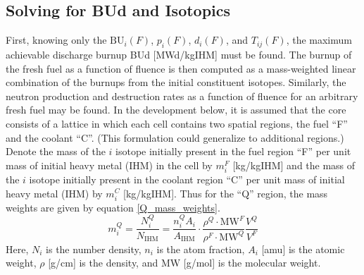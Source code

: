 \subsection{Solving for BUd and Isotopics}
\label{1g_sec:solve_BUd_iso}
First, knowing only the $\mbox{BU}_i(F)$, $p_i(F)$, $d_i(F)$, and $T_{ij}(F)$,
the maximum achievable discharge burnup BUd [MWd/kgIHM] must be found.  The burnup of the fresh 
fuel as a function of fluence is then computed as a mass-weighted linear combination of the burnups 
from the initial constituent isotopes.  Similarly, the neutron production and destruction rates as a 
function of fluence for an arbitrary fresh fuel may be found.  In the development below, it is 
assumed that the core consists of a lattice in which each cell contains two spatial regions, the fuel ``F'' 
and the coolant ``C''. (This formulation could generalize to additional regions.)  Denote the mass of the 
$i$ isotope initially present in the fuel region ``F'' per unit mass of initial heavy 
metal (IHM) in the cell by $m_i^F$ [kg/kgIHM] and the mass of the $i$ 
isotope initially present in the coolant region ``C'' per unit mass of initial heavy metal (IHM) by 
$m_i^C$ [kg/kgIHM].  Thus for the ``Q'' region, the mass weights are given 
by equation \ref{Q_mass_weights}.
\begin{equation}
\label{Q_mass_weights}
m_i^Q = \frac{N_i^Q}{N_{\mbox{IHM}}} = \frac{n_i^Q A_i}{A_{\mbox{IHM}}} \cdot \frac{\rho^Q\cdot\mbox{MW}^F}{\rho^F\cdot\mbox{MW}^Q} \frac{V^Q}{V^F}
\end{equation}
Here, $N_i$ is the number density, $n_i$ is the atom fraction, $A_i$ [amu] is the atomic weight, 
$\rho$ [g/cm] is the density, and $\mbox{MW}$ [g/mol] is the molecular weight.

